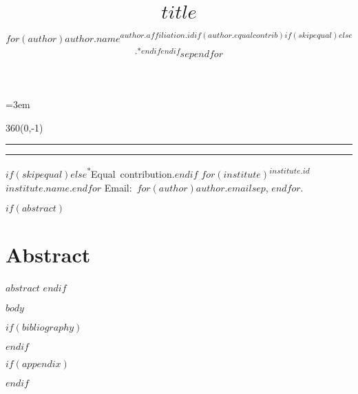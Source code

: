\documentclass[letterpaper,12pt]{article}
\title{$title$}
\author{$for(author)$\mbox{$author.name$\textsuperscript{$author.affiliation.id$$if(author.equalcontrib)$$if(skipequal)$$else$,*$endif$$endif$}}$sep$\quad $endfor$}
\date{}
\begin{document}
\maketitle

\thispagestyle{fancy}
\parindent=3em
\setnowidow[2]

\newlength{\lmargin}
\setlength{\lmargin}{\dimexpr(\paperwidth-\textwidth)/2\relax}
\textblockorigin{\lmargin}{\paperheight}
\setlength{\TPHorizModule}{1pt}
\setlength{\TPVertModule}{1in}
\begin{textblock}{360}(0,-1)
    \parindent=0pt%
    \normalfont\scriptsize\raggedright%
    \hrule%
    \hrule%
    \vspace{1.5ex}%
    $if(skipequal)$$else$\mbox{\textsuperscript{*}Equal contribution.}\enskip$endif$%
    $for(institute)$\mbox{\textsuperscript{$institute.id$}$institute.name$.}\enskip$endfor$%
    Email:~$for(author)$\mbox{\texttt{$author.email$}}$sep$, $endfor$.%
\end{textblock}

$if(abstract)$
\section*{Abstract}
$abstract$
$endif$

$body$

$if(bibliography)$
\footnotesize


\normalsize
$endif$

$if(appendix)$
\renewcommand\thefigure{S\arabic{figure}}
\renewcommand\thetable{S\arabic{table}}
\setcounter{figure}{0}
\setcounter{table}{0}
\clearpage
\appendix

$endif$
\end{document}
